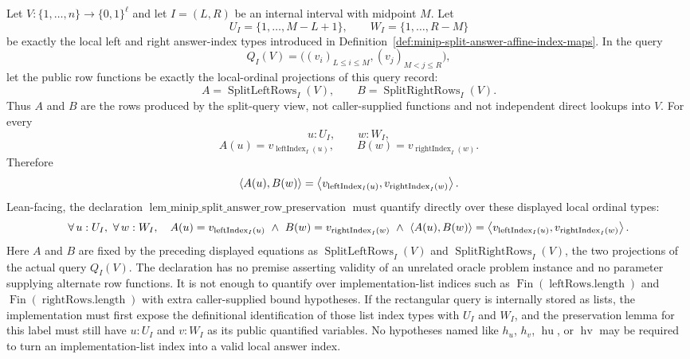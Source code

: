 \begin{lemma}
  \label{lem:minip-split-answer-row-preservation}
  Let $V:\{1,\ldots,n\}\to\{0,1\}^{\ell}$ and let $I=(L,R)$ be an internal
  interval with midpoint $M$.  Let
  \[
    U_I=\{1,\ldots,M-L+1\},
    \qquad
    W_I=\{1,\ldots,R-M\}
  \]
  be exactly the local left and right answer-index types introduced in
  Definition~\ref{def:minip-split-answer-affine-index-maps}.  In the query
  \[
    Q_I(V)=
      \bigl((v_i)_{L\leq i\leq M},(v_j)_{M<j\leq R}\bigr),
  \]
  let the public row functions be exactly the local-ordinal projections of
  this query record:
  \[
    A=\operatorname{SplitLeftRows}_I(V),
    \qquad
    B=\operatorname{SplitRightRows}_I(V).
  \]
  Thus $A$ and $B$ are the rows produced by the split-query view, not
  caller-supplied functions and not independent direct lookups into $V$.  For
  every
  \[
    u:U_I,\qquad w:W_I,
  \]
  \[
    A(u)=v_{\operatorname{leftIndex}_I(u)},
    \qquad
    B(w)=v_{\operatorname{rightIndex}_I(w)}.
  \]
  Therefore
  \[
    \left\langle A(u),B(w)\right\rangle
      =
    \left\langle v_{\operatorname{leftIndex}_I(u)},v_{\operatorname{rightIndex}_I(w)}\right\rangle.
  \]
  Lean-facing, the declaration
  $\operatorname{lem\_minip\_split\_answer\_row\_preservation}$ must quantify
  directly over these displayed local ordinal types:
  \[
    \forall\,u:U_I,\ \forall\,w:W_I,\quad
      A(u)=v_{\operatorname{leftIndex}_I(u)}
      \ \wedge\
      B(w)=v_{\operatorname{rightIndex}_I(w)}
      \ \wedge\
      \left\langle A(u),B(w)\right\rangle
        =
      \left\langle v_{\operatorname{leftIndex}_I(u)},v_{\operatorname{rightIndex}_I(w)}\right\rangle.
  \]
  Here $A$ and $B$ are fixed by the preceding displayed equations as
  $\operatorname{SplitLeftRows}_I(V)$ and
  $\operatorname{SplitRightRows}_I(V)$, the two projections of the actual
  query $Q_I(V)$.  The declaration has no premise asserting validity of an
  unrelated oracle problem instance and no parameter supplying alternate row
  functions.
  It is not enough to quantify over implementation-list indices such as
  $\operatorname{Fin}(\operatorname{leftRows.length})$ and
  $\operatorname{Fin}(\operatorname{rightRows.length})$ with extra
  caller-supplied bound hypotheses.  If the rectangular query is internally
  stored as lists, the implementation must first expose the definitional
  identification of those list index types with $U_I$ and $W_I$, and the
  preservation lemma for this label must still have $u:U_I$ and $v:W_I$ as its
  public quantified variables.  No hypotheses named like $h_u$, $h_v$,
  $\operatorname{hu}$, or $\operatorname{hv}$ may be required to turn an
  implementation-list index into a valid local answer index.
\end{lemma}
